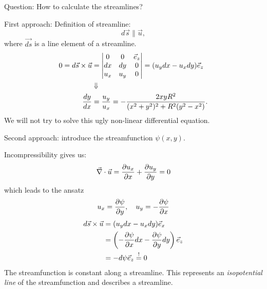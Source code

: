 \bigskip
Question: How to calculate the streamlines?

First approach:
Definition of streamline:
\begin{equation}
d\vec{s}\parallel\vec{u},
\end{equation}
where $\vec{ds}$ is a line element of a streamline.
\begin{align}
0=d\vec{s}\times\vec{u} &=
\begin{vmatrix}
0 & 0 & \vec{e}_z \\
dx & dy & 0 \\
u_x & u_y & 0
\end{vmatrix} =
(u_ydx-u_xdy)\vec{e}_z\\
&\Downarrow\notag\\
\frac{d y}{d x} &= \frac{u_y}{u_x} = -\frac{2xyR^2}{(x^2+y^2)^2+R^2(y^2-x^2)}.
\end{align}
We will not try to solve this ugly non-linear differential equation.

Second approach: introduce the streamfunction $\psi(x,y)$.

Incompressibility gives us:
\begin{equation}
 \vec{\nabla}\cdot\vec{u} = \frac{\partial u_x}{\partial x}+\frac{\partial u_y}{\partial y}=0
\end{equation}
which leads to the ansatz
\begin{equation}
 u_x = \frac{\partial \psi}{\partial y}, \quad u_y = -\frac{\partial \psi}{\partial x} \label{eq:uxuy2}
\end{equation}
\begin{align}
d\vec{s}\times\vec{u} &= (u_ydx-u_xdy)\vec{e}_x \\
&= \left(-\frac{\partial \psi}{\partial x}dx-\frac{\partial \psi}{\partial y}dy\right)\vec{e}_z\\
&= -d\psi \vec{e}_z \overset{!}{=} 0
\end{align}
The streamfunction is constant along a streamline. This represents an \emph{isopotential line} of the streamfunction and describes a streamline.

